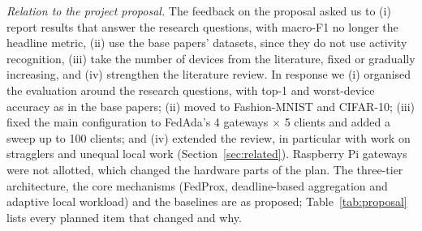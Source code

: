 \documentclass[conference]{IEEEtran}
\begin{document}
\textit{Relation to the project proposal.} The feedback on the proposal asked us to (i) report results that answer the research questions, with macro-F1 no longer the headline metric, (ii) use the base papers' datasets, since they do not use activity recognition, (iii) take the number of devices from the literature, fixed or gradually increasing, and (iv) strengthen the literature review. In response we (i) organised the evaluation around the research questions, with top-1 and worst-device accuracy as in the base papers; (ii) moved to Fashion-MNIST and CIFAR-10; (iii) fixed the main configuration to FedAda's 4 gateways $\times$ 5 clients and added a sweep up to 100 clients; and (iv) extended the review, in particular with work on stragglers and unequal local work (Section~\ref{sec:related}). Raspberry Pi gateways were not allotted, which changed the hardware parts of the plan. The three-tier architecture, the core mechanisms (FedProx, deadline-based aggregation and adaptive local workload) and the baselines are as proposed; Table~\ref{tab:proposal} lists every planned item that changed and why.
\end{document}
